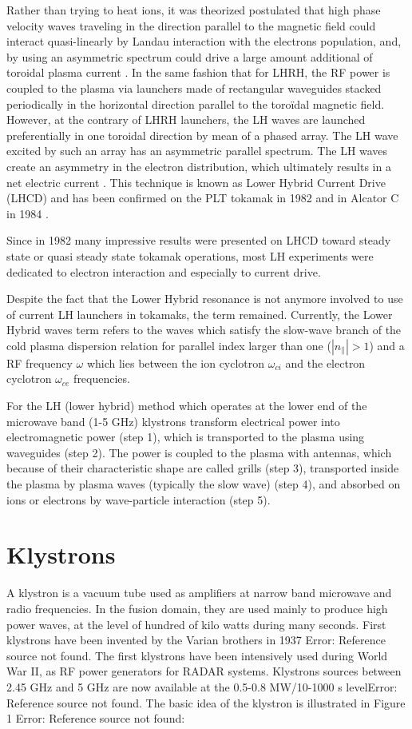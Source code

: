 Rather than trying to heat ions, it was theorized postulated that high phase velocity waves traveling in the direction parallel to the magnetic field could interact quasi-linearly by Landau interaction with the electrons population, and, by using an asymmetric spectrum could drive a large amount additional of toroidal plasma current \cite{Fisch1978}. In the same fashion that for LHRH, the RF power is coupled to the plasma via launchers made of rectangular waveguides stacked periodically in the horizontal direction parallel to the toroïdal magnetic field. However, at the contrary of LHRH launchers, the LH waves are launched preferentially in one toroidal direction by mean of a phased array. The LH wave excited by such an array has an asymmetric parallel spectrum. The LH waves create an asymmetry in the electron distribution, which ultimately results in a net electric current \cite{Fisch1987a}. This technique is known as Lower Hybrid Current Drive (LHCD) and has been confirmed on the PLT tokamak in 1982 \cite{Bernabei1982, Motley1985, Jobes1985} and in Alcator C in 1984 \cite{Porkolab1984}. 

Since in 1982 many impressive results were presented on LHCD\cite{Dnestrovskij1982, Hooke1982, Porkolab1982, Tonon1982} toward steady state or quasi steady state tokamak operations, most LH experiments were dedicated to electron interaction and especially to current drive. 

Despite the fact that the Lower Hybrid resonance is not anymore involved to use of current LH launchers in tokamaks, the term remained. Currently, the Lower Hybrid waves term refers to the waves which satisfy the slow-wave branch of the cold plasma dispersion relation for parallel index larger than one ($|n_{\parallel}|>1$) and a RF frequency $\omega$ which lies between the ion cyclotron $\omega_{ci}$ and the electron cyclotron $\omega_{ce}$ frequencies. 

For the LH (lower hybrid) method which operates at the lower end of the microwave band (1-5 GHz) klystrons transform electrical power into electromagnetic power (step 1), which is transported to the plasma using waveguides (step 2). The power is coupled to the plasma with antennas, which because of their characteristic shape are called grills (step 3), transported inside the plasma by plasma waves (typically the slow wave) (step 4), and absorbed on ions or electrons by wave-particle interaction (step 5).

\section{Klystrons}
A klystron is a vacuum tube used as amplifiers at narrow band microwave and radio frequencies. In the fusion domain, they are used mainly to produce high power waves, at the level of hundred of kilo watts during many seconds. First klystrons have been invented by the Varian brothers in 1937 Error: Reference source not found. The first klystrons have been intensively used during World War II, as RF power generators for RADAR systems. Klystrons sources between 2.45 GHz and 5 GHz are now available at the 0.5-0.8 MW/10-1000 s levelError: Reference source not found. 
The basic idea of the klystron is illustrated in Figure 1 Error: Reference source not found:

